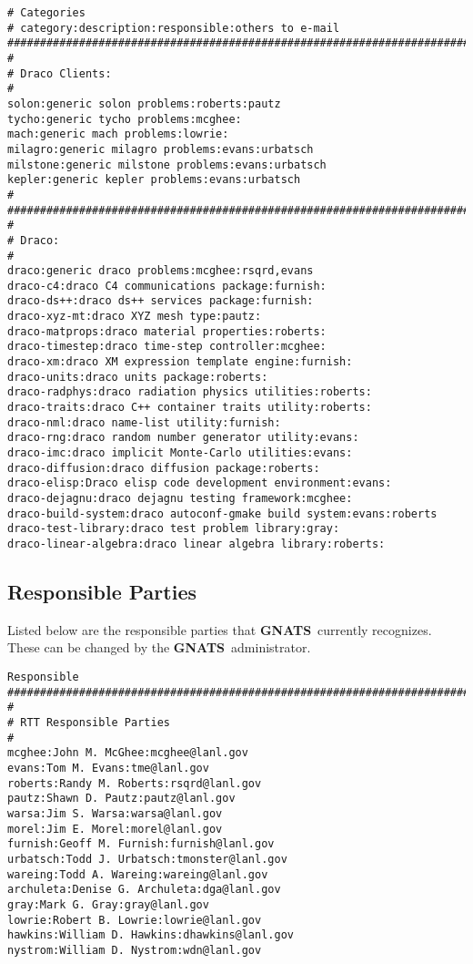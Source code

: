 \documentclass[11pt]{nmemo}
\newcommand{\gnats}{{\normalfont\bfseries GNATS}}
\begin{document}
\begin{verbatim}
# Categories
# category:description:responsible:others to e-mail 
#######################################################################
#
# Draco Clients:
#
solon:generic solon problems:roberts:pautz
tycho:generic tycho problems:mcghee:
mach:generic mach problems:lowrie:
milagro:generic milagro problems:evans:urbatsch
milstone:generic milstone problems:evans:urbatsch
kepler:generic kepler problems:evans:urbatsch
#
#######################################################################
#
# Draco:
#
draco:generic draco problems:mcghee:rsqrd,evans
draco-c4:draco C4 communications package:furnish:
draco-ds++:draco ds++ services package:furnish:
draco-xyz-mt:draco XYZ mesh type:pautz:
draco-matprops:draco material properties:roberts:
draco-timestep:draco time-step controller:mcghee:
draco-xm:draco XM expression template engine:furnish:
draco-units:draco units package:roberts:
draco-radphys:draco radiation physics utilities:roberts:
draco-traits:draco C++ container traits utility:roberts:
draco-nml:draco name-list utility:furnish:
draco-rng:draco random number generator utility:evans:
draco-imc:draco implicit Monte-Carlo utilities:evans:
draco-diffusion:draco diffusion package:roberts:
draco-elisp:Draco elisp code development environment:evans:
draco-dejagnu:draco dejagnu testing framework:mcghee:
draco-build-system:draco autoconf-gmake build system:evans:roberts
draco-test-library:draco test problem library:gray:
draco-linear-algebra:draco linear algebra library:roberts:
\end{verbatim}

\subsection{Responsible Parties}
Listed below are the responsible parties that \gnats\ currently recognizes.
These can be changed by the \gnats\ administrator.

\begin{verbatim}
Responsible
#######################################################################
#
# RTT Responsible Parties
#
mcghee:John M. McGhee:mcghee@lanl.gov
evans:Tom M. Evans:tme@lanl.gov
roberts:Randy M. Roberts:rsqrd@lanl.gov
pautz:Shawn D. Pautz:pautz@lanl.gov
warsa:Jim S. Warsa:warsa@lanl.gov
morel:Jim E. Morel:morel@lanl.gov
furnish:Geoff M. Furnish:furnish@lanl.gov
urbatsch:Todd J. Urbatsch:tmonster@lanl.gov
wareing:Todd A. Wareing:wareing@lanl.gov
archuleta:Denise G. Archuleta:dga@lanl.gov
gray:Mark G. Gray:gray@lanl.gov
lowrie:Robert B. Lowrie:lowrie@lanl.gov
hawkins:William D. Hawkins:dhawkins@lanl.gov
nystrom:William D. Nystrom:wdn@lanl.gov
\end{verbatim}
\end{document}
